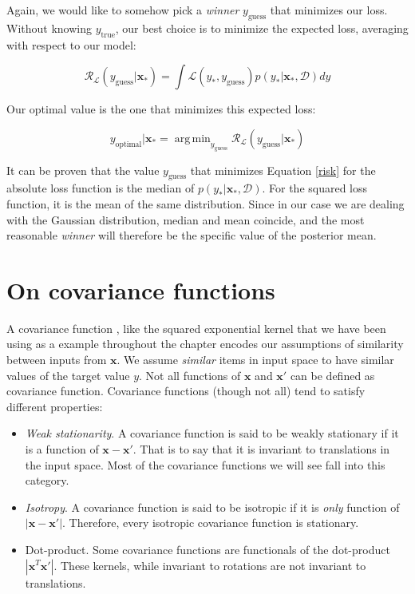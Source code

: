 \documentclass[10pt,a4paper,twoside]{book}
\DeclareMathOperator*{\argmin}{arg\,min}
\begin{document}
Again, we would like to somehow pick a \textit{winner} $y_{\mathrm{guess}}$ that minimizes our loss. Without knowing $y_{\mathrm{true}}$, our best choice is to minimize the expected loss, averaging with respect to our model:

\begin{equation}
\mathcal{R}_{\mathcal{L}}(y_{\mathrm{guess}}|\boldsymbol{x}_*) = \int \mathcal{L}(y_{*}, y_{\mathrm{guess}})p(y_*|\boldsymbol{x}_*, \mathcal{D})dy
\end{equation}

Our optimal value is the one that minimizes this expected loss:

\begin{equation}
\label{risk}
y_{\mathrm{optimal}}|\boldsymbol{x}_* = \argmin_{y_{\mathrm{guess}}}\mathcal{R}_{\mathcal{L}}(y_{\mathrm{guess}}|\boldsymbol{x}_*)
\end{equation}

It can be proven that the value $y_{\mathrm{guess}}$ that minimizes Equation \ref{risk} for the absolute loss function is the median of $p(y_*|\boldsymbol{x}_*,\mathcal{D})$. For the squared loss function, it is the mean of the same distribution. Since in our case we are dealing with the Gaussian distribution, median and mean coincide, and the most reasonable \textit{winner} will therefore be the specific value of the posterior mean. 

\section{On covariance functions}
\label{covariancefunc}

A covariance function \cite{Wackernagel1995}, like the squared exponential kernel that we have been using as a example throughout the chapter encodes our assumptions of similarity between inputs from $\boldsymbol{x}$. We assume \textit{similar} items in input space to have similar values of the target value $y$. Not all functions of $\boldsymbol{x}$ and $\boldsymbol{x'}$ can be defined as covariance function. Covariance functions (though not all) tend to satisfy different properties:

\begin{itemize}
\item \textit{Weak stationarity}. A covariance function is said to be weakly stationary if it is a function of $\boldsymbol{x} - \boldsymbol{x'}$. That is to say that it is invariant to translations in the input space. Most of the covariance functions we will see fall into this category.
\item \textit{Isotropy}. A covariance function is said to be isotropic if it is \textit{only} function of  $|\boldsymbol{x} - \boldsymbol{x'}|$. Therefore, every isotropic covariance function is stationary.
\item Dot-product. Some covariance functions are functionals of the dot-product $|\boldsymbol{x}^T \boldsymbol{x'}|$. These kernels, while invariant to rotations are not invariant to translations.
\end{itemize}
\end{document}
